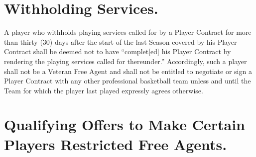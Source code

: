 \documentclass[
]{book}
\begin{document}
\hypertarget{withholding-services.}{%
\section{Withholding Services.}\label{withholding-services.}}

A player who withholds playing services called for by a Player Contract for more than thirty (30) days after the start of the last Season covered by his Player Contract shall be deemed not to have ``complet{[}ed{]} his Player Contract by rendering the playing services called for thereunder.'' Accordingly, such a player shall not be a Veteran Free Agent and shall not be entitled to negotiate or sign a Player Contract with any other professional basketball team unless and until the Team for which the player last played expressly agrees otherwise.

\hypertarget{qualifying-offers-to-make-certain-players-restricted-free-agents.}{%
\section{Qualifying Offers to Make Certain Players Restricted Free Agents.}\label{qualifying-offers-to-make-certain-players-restricted-free-agents.}}
\end{document}
